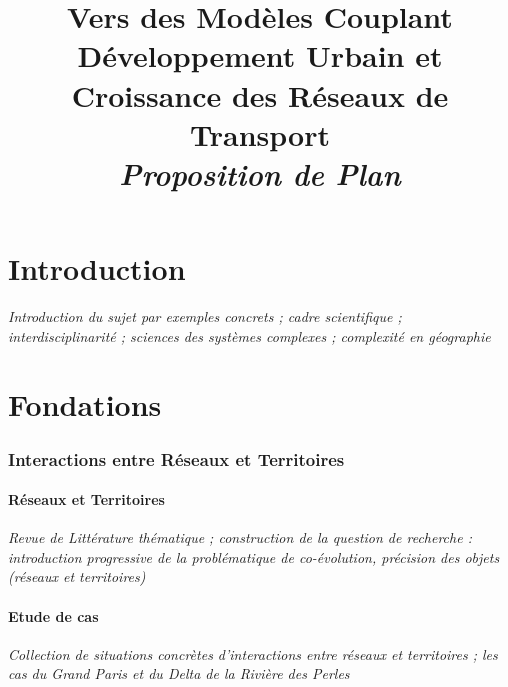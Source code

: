 




\title{Vers des Modèles Couplant Développement Urbain et Croissance des Réseaux de Transport\bigskip\\
\textit{Proposition de Plan}
}
\author{}


\maketitle

\justify


\begin{abstract}
\end{abstract}


\part*{Introduction}

\textit{Introduction du sujet par exemples concrets ; cadre scientifique ; interdisciplinarité ; sciences des systèmes complexes ; complexité en géographie}

\part{Fondations}


\section{Interactions entre Réseaux et Territoires}

\subsection{Réseaux et Territoires}

\textit{Revue de Littérature thématique ; construction de la question de recherche : introduction progressive de la problématique de co-évolution, précision des objets (réseaux et territoires)}


\subsection{Etude de cas}

\textit{Collection de situations concrètes d'interactions entre réseaux et territoires ; les cas du Grand Paris et du Delta de la Rivière des Perles} 


